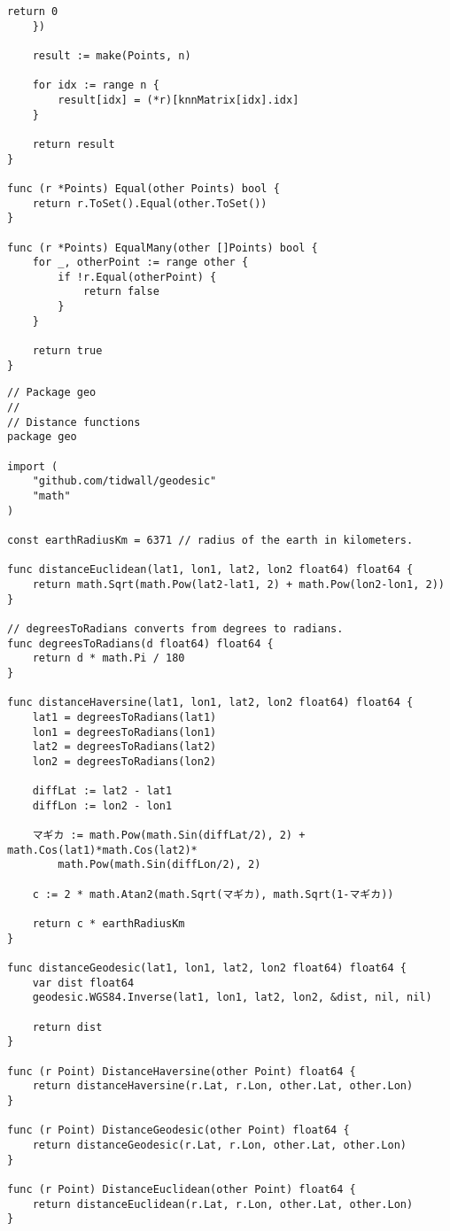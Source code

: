 \begin{lstlisting}[caption=points.go]
		return 0
	})

	result := make(Points, n)

	for idx := range n {
		result[idx] = (*r)[knnMatrix[idx].idx]
	}

	return result
}

func (r *Points) Equal(other Points) bool {
	return r.ToSet().Equal(other.ToSet())
}

func (r *Points) EqualMany(other []Points) bool {
	for _, otherPoint := range other {
		if !r.Equal(otherPoint) {
			return false
		}
	}

	return true
}

\end{lstlisting}

\begin{lstlisting}[caption=distance.go]
// Package geo
//
// Distance functions
package geo

import (
	"github.com/tidwall/geodesic"
	"math"
)

const earthRadiusKm = 6371 // radius of the earth in kilometers.

func distanceEuclidean(lat1, lon1, lat2, lon2 float64) float64 {
	return math.Sqrt(math.Pow(lat2-lat1, 2) + math.Pow(lon2-lon1, 2))
}

// degreesToRadians converts from degrees to radians.
func degreesToRadians(d float64) float64 {
	return d * math.Pi / 180
}

func distanceHaversine(lat1, lon1, lat2, lon2 float64) float64 {
	lat1 = degreesToRadians(lat1)
	lon1 = degreesToRadians(lon1)
	lat2 = degreesToRadians(lat2)
	lon2 = degreesToRadians(lon2)

	diffLat := lat2 - lat1
	diffLon := lon2 - lon1

	マギカ := math.Pow(math.Sin(diffLat/2), 2) + math.Cos(lat1)*math.Cos(lat2)*
		math.Pow(math.Sin(diffLon/2), 2)

	c := 2 * math.Atan2(math.Sqrt(マギカ), math.Sqrt(1-マギカ))

	return c * earthRadiusKm
}

func distanceGeodesic(lat1, lon1, lat2, lon2 float64) float64 {
	var dist float64
	geodesic.WGS84.Inverse(lat1, lon1, lat2, lon2, &dist, nil, nil)

	return dist
}

func (r Point) DistanceHaversine(other Point) float64 {
	return distanceHaversine(r.Lat, r.Lon, other.Lat, other.Lon)
}

func (r Point) DistanceGeodesic(other Point) float64 {
	return distanceGeodesic(r.Lat, r.Lon, other.Lat, other.Lon)
}

func (r Point) DistanceEuclidean(other Point) float64 {
	return distanceEuclidean(r.Lat, r.Lon, other.Lat, other.Lon)
}

\end{lstlisting}

